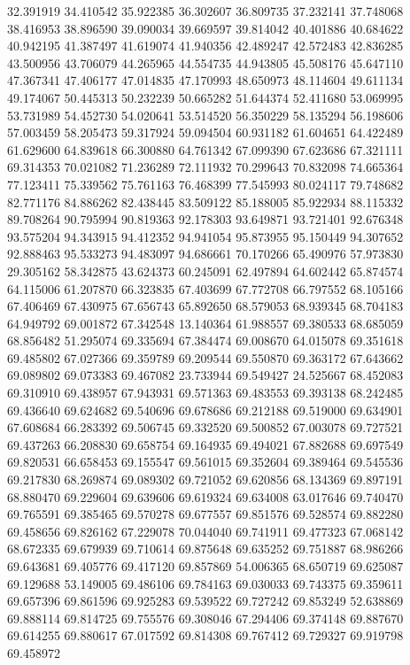 32.391919
34.410542
35.922385
36.302607
36.809735
37.232141
37.748068
38.416953
38.896590
39.090034
39.669597
39.814042
40.401886
40.684622
40.942195
41.387497
41.619074
41.940356
42.489247
42.572483
42.836285
43.500956
43.706079
44.265965
44.554735
44.943805
45.508176
45.647110
47.367341
47.406177
47.014835
47.170993
48.650973
48.114604
49.611134
49.174067
50.445313
50.232239
50.665282
51.644374
52.411680
53.069995
53.731989
54.452730
54.020641
53.514520
56.350229
58.135294
56.198606
57.003459
58.205473
59.317924
59.094504
60.931182
61.604651
64.422489
61.629600
64.839618
66.300880
64.761342
67.099390
67.623686
67.321111
69.314353
70.021082
71.236289
72.111932
70.299643
70.832098
74.665364
77.123411
75.339562
75.761163
76.468399
77.545993
80.024117
79.748682
82.771176
84.886262
82.438445
83.509122
85.188005
85.922934
88.115332
89.708264
90.795994
90.819363
92.178303
93.649871
93.721401
92.676348
93.575204
94.343915
94.412352
94.941054
95.873955
95.150449
94.307652
92.888463
95.533273
94.483097
94.686661
70.170266
65.490976
57.973830
29.305162
58.342875
43.624373
60.245091
62.497894
64.602442
65.874574
64.115006
61.207870
66.323835
67.403699
67.772708
66.797552
68.105166
67.406469
67.430975
67.656743
65.892650
68.579053
68.939345
68.704183
64.949792
69.001872
67.342548
13.140364
61.988557
69.380533
68.685059
68.856482
51.295074
69.335694
67.384474
69.008670
64.015078
69.351618
69.485802
67.027366
69.359789
69.209544
69.550870
69.363172
67.643662
69.089802
69.073383
69.467082
23.733944
69.549427
24.525667
68.452083
69.310910
69.438957
67.943931
69.571363
69.483553
69.393138
68.242485
69.436640
69.624682
69.540696
69.678686
69.212188
69.519000
69.634901
67.608684
66.283392
69.506745
69.332520
69.500852
67.003078
69.727521
69.437263
66.208830
69.658754
69.164935
69.494021
67.882688
69.697549
69.820531
66.658453
69.155547
69.561015
69.352604
69.389464
69.545536
69.217830
68.269874
69.089302
69.721052
69.620856
68.134369
69.897191
68.880470
69.229604
69.639606
69.619324
69.634008
63.017646
69.740470
69.765591
69.385465
69.570278
69.677557
69.851576
69.528574
69.882280
69.458656
69.826162
67.229078
70.044040
69.741911
69.477323
67.068142
68.672335
69.679939
69.710614
69.875648
69.635252
69.751887
68.986266
69.643681
69.405776
69.417120
69.857869
54.006365
68.650719
69.625087
69.129688
53.149005
69.486106
69.784163
69.030033
69.743375
69.359611
69.657396
69.861596
69.925283
69.539522
69.727242
69.853249
52.638869
69.888114
69.814725
69.755576
69.308046
67.294406
69.374148
69.887670
69.614255
69.880617
67.017592
69.814308
69.767412
69.729327
69.919798
69.458972
